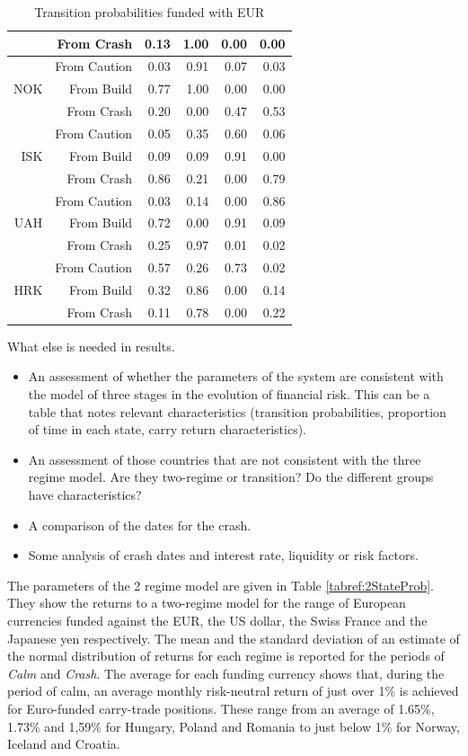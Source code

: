 \documentclass[12pt, a4paper, oneside]{article} %
\begin{document}
\begin{table}[!h]
\begin{tabular}{rrrrrr}
   & From Crash & 0.13 & 1.00 & 0.00 & 0.00 \\ 
\hline
\multirow{3}{*}{NOK}  & From Caution & 0.03 & 0.91 & 0.07 & 0.03 \\ 
   & From Build & 0.77 & 1.00 & 0.00 & 0.00 \\ 
  & From Crash & 0.20 & 0.00 & 0.47 & 0.53 \\ 
\hline
\multirow{3}{*}{ISK}   & From Caution & 0.05 & 0.35 & 0.60 & 0.06 \\ 
   & From Build & 0.09 & 0.09 & 0.91 & 0.00 \\ 
   & From Crash & 0.86 & 0.21 & 0.00 & 0.79 \\ 
\hline
\multirow{3}{*}{UAH} & From Caution & 0.03 & 0.14 & 0.00 & 0.86 \\ 
   & From Build & 0.72 & 0.00 & 0.91 & 0.09 \\ 
   & From Crash & 0.25 & 0.97 & 0.01 & 0.02 \\ 
\hline
\multirow{3}{*}{HRK}  & From Caution & 0.57 & 0.26 & 0.73 & 0.02 \\ 
   & From Build  & 0.32 & 0.86 & 0.00 & 0.14 \\ 
   & From Crash & 0.11 & 0.78 & 0.00 & 0.22 \\ 
   \hline
\end{tabular}
\caption{Transition probabilities funded with EUR}
\label{tabref:3StateTrans}
\end{table}


What else is needed in results.
\begin{itemize}
\item An assessment of whether the parameters of the system are consistent with the model of three stages in the evolution of financial risk.  This can be a table that notes relevant characteristics (transition probabilities, proportion of time in each state, carry return characteristics). 
\item An assessment of those countries that are not consistent with the three regime model.  Are they two-regime or transition?  Do the different groups have characteristics? 
\item A comparison of the dates for the crash. 
\item Some analysis of crash dates and interest rate, liquidity or risk factors. 
\end{itemize}
 
  
The parameters of the 2 regime model are given in Table \ref{tabref:2StateProb}.  They show the returns to a two-regime model for the range of European currencies funded against the EUR, the US dollar, the Swiss France and the Japanese yen respectively.  The mean and the standard deviation of an estimate of the normal distribution of returns for each regime is reported for the periods of \emph{Calm} and \emph{Crash}.  The average for each funding currency shows that, during the period of calm, an average  monthly risk-neutral return of just over 1\% is achieved for Euro-funded carry-trade positions. These range from an average of 1.65\%, 1.73\% and 1,59\% for Hungary, Poland and Romania to just below 1\% for Norway, Iceland and Croatia. 
\end{document}
